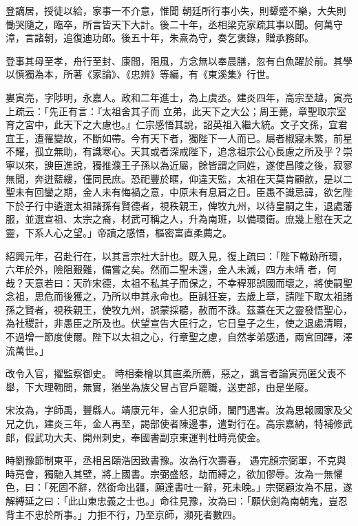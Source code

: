 \begin{pinyinscope}
 登謫居，授徒以給，家事一不介意，惟聞
 朝廷所行事小失，則顰蹙不樂，大失則慟哭隨之，臨卒，所言皆天下大計。後二十年，丞相梁克家疏其事以聞。何萬守漳，言諸朝，追復迪功郎。後五十年，朱熹為守，奏乞褒錄，贈承務郎。



 登事其母至孝，舟行至封、康間，阻風，方念無以奉晨膳，忽有白魚躍於前。其學以慎獨為本，所著《家論》、《忠辨》等編，有《東溪集》行世。



 婁寅亮，字陟明，永嘉人。政和二年進士，為上虞丞。建炎四年，高宗至越，寅亮上疏云：「先正有言：『太祖舍其子而
 立弟，此天下之大公；周王薨，章聖取宗室育之宮中，此天下之大慮也。』仁宗感悟其說，詔英祖入繼大統。文子文孫，宜君宜王，遭罹變故，不斷如帶。今有天下者，獨陛下一人而已。屬者椒寢未繁，前星不耀，孤立無助，有識寒心。天其或者深戒陛下，追念祖宗公心長慮之所及乎？崇寧以來，諛臣進說，獨推濮王子孫以為近屬，餘皆謂之同姓，遂使昌陵之後，寂寥無聞，奔迸藍縷，僅同民庶。恐祀豐於暱，仰違天監，太祖在天莫肯顧歆，是以二
 聖未有回鑾之期，金人未有悔禍之意，中原未有息肩之日。臣愚不識忌諱，欲乞陛下於子行中遴選太祖諸孫有賢德者，視秩親王，俾牧九州，以待皇嗣之生，退處藩服，並選宣祖、太宗之裔，材武可稱之人，升為南班，以備環衛。庶幾上慰在天之靈，下系人心之望。」帝讀之感悟，樞密富直柔薦之。



 紹興元年，召赴行在，以其言宗社大計也。既入見，復上疏曰：「陛下轍跡所環，六年於外，險阻艱難，備嘗之矣。然而二聖未還，金人未滅，四方未靖
 者，何哉？天意若曰：天祚宋德，太祖不私其子而保之，不幸稈邪誤國而壞之，將使嗣聖念祖，思危而後獲之，乃所以申其永命也。臣誠狂妄，去歲上章，請陛下取太祖諸孫之賢者，視秩親王，使牧九州，誤蒙採聽，赦而不誅。茲蓋在天之靈發悟聖心，為社稷計，非愚臣之所及也。伏望宣告大臣行之，它日皇子之生，使之退處清暇，不過增一節度使爾。陛下以太祖之心，行章聖之慮，自然孝弟感通，兩宮回蹕，澤流萬世。」



 改令入官，擢監察御史。
 時相秦檜以其直柔所薦，惡之，諷言者論寅亮匿父喪不舉，下大理鞫問，無實，猶坐為族父冒占官戶罷職，送吏部，由是坐廢。



 宋汝為，字師禹，豐縣人。靖康元年，金人犯京師，闔門遇害。汝為思報國家及父兄之仇，建炎三年，金人再至，謁部使者陳邊事，遣對行在。高宗嘉納，特補修武郎，假武功大夫、開州刺史，奉國書副京東運判杜時亮使金。



 時劉豫節制東平，丞相呂頤浩因致書豫。汝為行次壽春，
 遇完顏宗弼軍，不克與時亮會，獨馳入其壁，將上國書。宗弼盛怒，劫而縛之，欲加僇辱。汝為一無懼色，曰：「死固不辭，然銜命出疆，願達書吐一辭，死未晚。」宗弼顧汝為不屈，遂解縛延之曰：「此山東忠義之士也。」命往見豫，汝為曰：「願伏劍為南朝鬼，豈忍背主不忠於所事。」力拒不行，乃至京師，瀕死者數四。




\end{pinyinscope}
